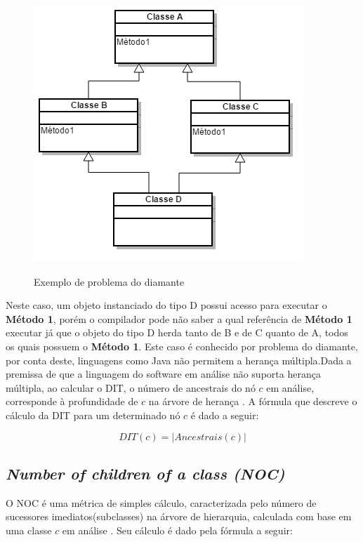 \documentclass[
	12pt,				%
	oneside,			%
	a4paper,			%
	english,			%
	brazil				%
	]{abntex2ppgsi}
\begin{document}
\begin{figure}[H]%
	\centering
 	  \caption{Exemplo de problema do diamante}
		\includegraphics{diagrama_diamante.png}
	\label{fig:tipos-custo-arvore}
\end{figure}

Neste caso, um objeto instanciado do tipo D possui acesso para executar o \textbf{Método 1}, porém o compilador pode não saber a qual referência de \textbf{Método 1} executar já que o objeto do tipo D herda tanto de B e de C quanto de A, todos os quais possuem o \textbf{Método 1}. Este caso é conhecido por problema do diamante, por conta deste, linguagens como Java não permitem a herança múltipla.Dada a premissa de que a linguagem do software em análise não suporta herança múltipla, ao calcular o DIT, o número de ancestrais do nó $c$ em análise, corresponde à profundidade de $c$ na árvore de herança \cite{bruntink04}. A fórmula que descreve o cálculo da DIT para um determinado nó $c$ é dado a seguir:

\begin{equation}
  DIT(c) = |Ancestrais(c)|
	\label{eq:calc-dit}
\end{equation}

\subsection{\textit{Number of children of a class (NOC)}}

O NOC é uma métrica de simples cálculo, caracterizada pelo número de sucessores imediatos(subclasses) na árvore de hierarquia, calculada com base em  uma classe $c$ em análise \cite{kan95}. Seu cálculo é dado pela fórmula a seguir:
\end{document}
